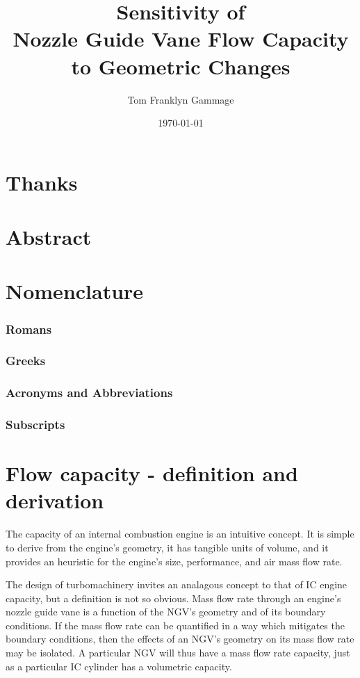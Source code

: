 \documentclass[a4paper, 11pt, twoside]{report}
\title{Sensitivity of\\Nozzle Guide Vane Flow Capacity\\to Geometric Changes}
\author{Tom Franklyn Gammage}
\date{\mydate\today}
\begin{document}
\maketitle

\chapter*{Thanks}

\chapter*{Abstract}

\tableofcontents
\listoffigures
\listoftables

\chapter*{Nomenclature}
\subsection*{Romans}
\subsection*{Greeks}
\subsection*{Acronyms and Abbreviations}
\subsection*{Subscripts}



\chapter{Flow capacity - definition and derivation}
\label{chapter_flow_capacity_definition_and_derivation}

The capacity of an internal combustion engine is an intuitive concept. It is simple to derive from the engine's geometry, it has tangible units of volume, and it provides an heuristic for the engine's size, performance, and air mass flow rate.

The design of turbomachinery invites an analagous concept to that of IC engine capacity, but a definition is not so obvious. Mass flow rate through an engine's nozzle guide vane is a function of the NGV's geometry and of its boundary conditions. If the mass flow rate can be quantified in a way which mitigates the boundary conditions, then the effects of an NGV's geometry on its mass flow rate may be isolated. A particular NGV will thus have a mass flow rate capacity, just as a particular IC cylinder has a volumetric capacity.
\end{document}
